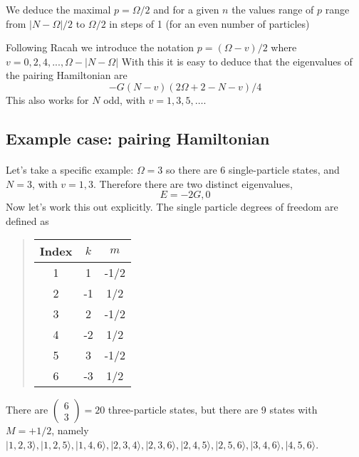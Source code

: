 \documentclass[%
oneside,                 %
final,                   %
10pt]{article}
\begin{document}
We deduce the maximal $p = \Omega/2$ and for a given $n$ the 
values range of $p$ range from $|N-\Omega|/2$ to $\Omega/2$ in steps of 1 
(for an even number of particles) 

Following Racah we introduce the notation
$p = (\Omega - v)/2$
where $v = 0, 2, 4,..., \Omega - |N-\Omega|$ 
With this it is easy to deduce that the eigenvalues of the pairing Hamiltonian are
\[
-G(N-v)(2\Omega +2-N-v)/4
\]
This also works for $N$ odd, with $v= 1,3,5, \dots$.



\subsection*{Example case: pairing Hamiltonian}

\paragraph{}

Let's take a specific example: $\Omega = 3$ so there are 6 single-particle states, 
and $N = 3$, with $v= 1,3$. Therefore there are two distinct eigenvalues, 
\[
E = -2G, 0
\]
Now let's work this out explicitly. The single particle degrees of freedom are defined as


\begin{quote}
\begin{tabular}{ccc}
\hline
\multicolumn{1}{c}{ Index } & \multicolumn{1}{c}{ $k$ } & \multicolumn{1}{c}{ $m$ } \\
\hline
1     & 1   & -1/2 \\
2     & -1  & 1/2  \\
3     & 2   & -1/2 \\
4     & -2  & 1/2  \\
5     & 3   & -1/2 \\
6     & -3  & 1/2  \\
\hline
\end{tabular}
\end{quote}

\noindent
 There are  $\left( \begin{array}{c}6 \\ 3 \end{array} \right) = 20$ three-particle states, but there 
are 9 states with $M = +1/2$, namely
$| 1,2,3 \rangle, |1,2,5\rangle, | 1,4,6 \rangle, | 2,3,4 \rangle, |2,3,6 \rangle, | 2,4,5 \rangle, | 2, 5, 6 \rangle, |3,4,6 \rangle, | 4,5,6 \rangle$.
\end{document}
